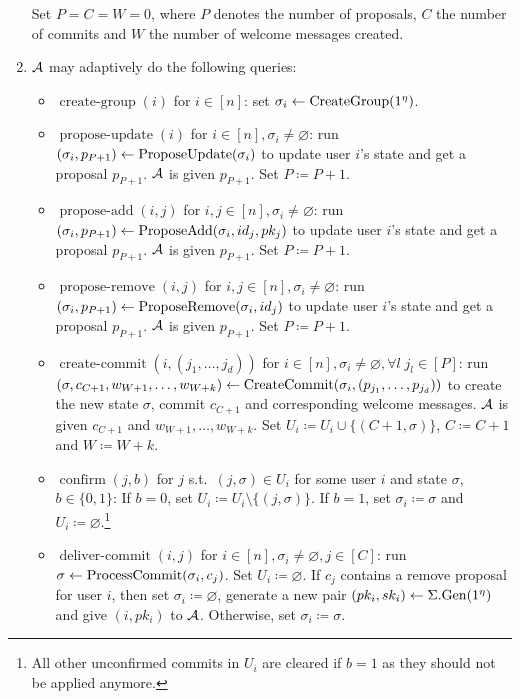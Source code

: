 \begin{definition}
\begin{enumerate}[1.]
		      Set $P = C = W = 0$, where $P$ denotes the number of proposals, $C$ the number of commits and $W$ the number of welcome messages created.
		\item $\mathcal{A}$ may adaptively do the following queries:
		      \begin{itemize}
			      \item $\operatorname{create-group}(i)$ for $i \in [n]$: set $\sigma_i \leftarrow \operatorname{CreateGroup}(1^\eta)$.
			      \item $\operatorname{propose-update}(i)$ for $i \in [n], \sigma_i \neq \varnothing$: run $(\sigma_i, p_{P + 1}) \leftarrow \operatorname{ProposeUpdate}(\sigma_i)$ to update user $i$'s state and get a proposal $p_{P + 1}$. $\mathcal{A}$ is given $p_{P + 1}$. Set $P \coloneqq P + 1$.
			      \item $\operatorname{propose-add}(i, j)$ for $i, j \in [n], \sigma_i \neq \varnothing$: run $(\sigma_i, p_{P + 1}) \leftarrow \operatorname{ProposeAdd}(\sigma_i, id_j, pk_j)$ to update user $i$'s state and get a proposal $p_{P + 1}$. $\mathcal{A}$ is given $p_{P + 1}$. Set $P \coloneqq P + 1$.
			      \item $\operatorname{propose-remove}(i, j)$ for $i, j \in [n], \sigma_i \neq \varnothing$: run $(\sigma_i, p_{P + 1}) \leftarrow \operatorname{ProposeRemove}(\sigma_i, id_j)$ to update user $i$'s state and get a proposal $p_{P + 1}$. $\mathcal{A}$ is given $p_{P + 1}$. Set $P \coloneqq P + 1$.
			      \item $\operatorname{create-commit}(i, (j_1, \ldots, j_d))$ for $i \in [n], \sigma_i \neq \varnothing, \forall l \; j_l \in [P]$: run $(\sigma, c_{C + 1}, w_{W + 1}, \ldots, w_{W + k}) \leftarrow \operatorname{CreateCommit}(\sigma_i, (p_{j_1}, \ldots, p_{j_d}))$ to create the new state $\sigma$, commit $c_{C + 1}$ and corresponding welcome messages. $\mathcal{A}$ is given $c_{C + 1}$ and $w_{W + 1}, \ldots, w_{W + k}$. Set $U_i \coloneqq U_i \cup \{(C + 1, \sigma)\}$, $C \coloneqq C + 1$ and $W \coloneqq W + k$.
			      \item $\operatorname{confirm}(j, b)$ for $j$ s.t.~$(j, \sigma) \in U_i$ for some user $i$ and state $\sigma$, $b \in \{0, 1\}$: If $b = 0$, set $U_i \coloneqq U_i \setminus \{(j, \sigma)\}$. If $b = 1$, set $\sigma_i \coloneqq \sigma$ and $U_i \coloneqq \varnothing$.\footnote{All other unconfirmed commits in $U_i$ are cleared if $b = 1$ as they should not be applied anymore.}
			      \item $\operatorname{deliver-commit}(i, j)$ for $i \in [n], \sigma_i \neq \varnothing, j \in [C]$: run $\sigma \leftarrow \operatorname{ProcessCommit}(\sigma_i, c_j)$. Set $U_i \coloneqq \varnothing$. If $c_j$ contains a remove proposal for user $i$, then set $\sigma_i \coloneqq \varnothing$, generate a new pair $(pk_i, sk_i) \leftarrow \Sigma.\mathrm{Gen}(1^\eta)$ and give $(i, pk_i)$ to $\mathcal{A}$. Otherwise, set $\sigma_i \coloneqq \sigma$.

\end{itemize}
\end{enumerate}
\end{definition}
